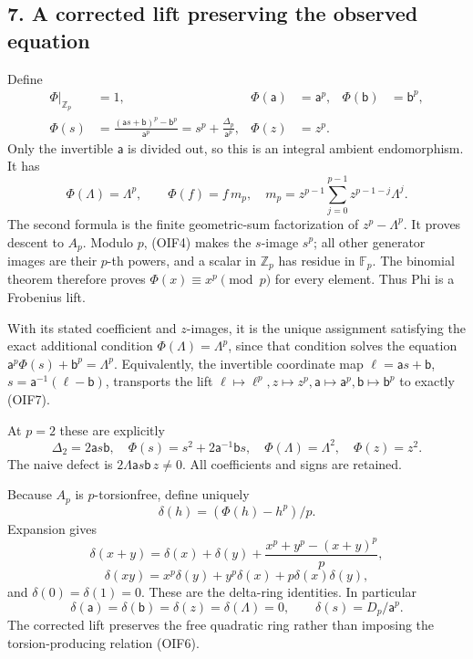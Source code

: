 \documentclass[
]{article}
\begin{document}
\subsection{7. A corrected lift preserving the observed
equation}\label{a-corrected-lift-preserving-the-observed-equation}

Define \[
\begin{aligned}
\Phi|_{\mathbb Z_p}&=1,&
\Phi(\mathsf a)&=\mathsf a^p,&
\Phi(\mathsf b)&=\mathsf b^p,\\
\Phi(s)&=\frac{(\mathsf a s+\mathsf b)^p-\mathsf b^p}{\mathsf a^p}
=s^p+\frac{\Delta_p}{\mathsf a^p},&
\Phi(z)&=z^p.
\end{aligned}
\tag{OIF7}
\] Only the invertible \(\mathsf a\) is divided out, so this is an
integral ambient endomorphism. It has \[
\Phi(\Lambda)=\Lambda^p,\qquad
\Phi(f)=f\,m_p,\quad
m_p=z^{p-1}\sum_{j=0}^{p-1}z^{p-1-j}\Lambda^j.
\tag{OIF8}
\] The second formula is the finite geometric-sum factorization of
\(z^p-\Lambda^p\). It proves descent to \(A_p\). Modulo \(p\), (OIF4)
makes the \(s\)-image \(s^p\); all other generator images are their
\(p\)-th powers, and a scalar in \(\mathbb Z_p\) has residue in
\(\mathbb F_p\). The binomial theorem therefore proves
\(\Phi(x)\equiv x^p\pmod p\) for every element. Thus Phi is a Frobenius
lift.

With its stated coefficient and \(z\)-images, it is the unique
assignment satisfying the exact additional condition
\(\Phi(\Lambda)=\Lambda^p\), since that condition solves the equation
\(\mathsf a^p\Phi(s)+\mathsf b^p=\Lambda^p\). Equivalently, the
invertible coordinate map \(\ell=\mathsf a s+\mathsf b\),
\(s=\mathsf a^{-1}(\ell-\mathsf b)\), transports the lift
\(\ell\mapsto\ell^p,z\mapsto z^p,\mathsf a\mapsto\mathsf a^p,\mathsf b\mapsto\mathsf b^p\)
to exactly (OIF7).

At \(p=2\) these are explicitly \[
\Delta_2=2\mathsf a s\mathsf b,\quad
\Phi(s)=s^2+2\mathsf a^{-1}\mathsf b s,\quad
\Phi(\Lambda)=\Lambda^2,\quad\Phi(z)=z^2.
\tag{OIF9}
\] The naive defect is \(2\Lambda\mathsf a s\mathsf b\,z\ne0\). All
coefficients and signs are retained.

Because \(A_p\) is \(p\)-torsionfree, define uniquely \[
\delta(h)=(\Phi(h)-h^p)/p.
\tag{OIF10}
\] Expansion gives \[
\delta(x+y)=\delta(x)+\delta(y)
+\frac{x^p+y^p-(x+y)^p}{p},
\] \[
\delta(xy)=x^p\delta(y)+y^p\delta(x)+p\delta(x)\delta(y),
\] and \(\delta(0)=\delta(1)=0\). These are the delta-ring identities.
In particular \[
\delta(\mathsf a)=\delta(\mathsf b)=\delta(z)=\delta(\Lambda)=0,
\qquad \delta(s)=D_p/\mathsf a^p.
\tag{OIF11}
\] The corrected lift preserves the free quadratic ring rather than
imposing the torsion-producing relation (OIF6).
\end{document}
